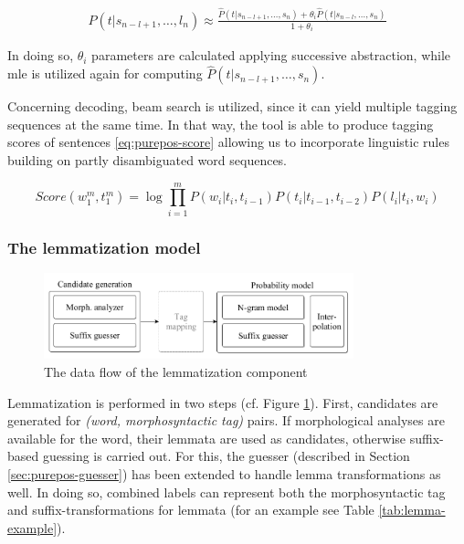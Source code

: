 \begin{align}
 P(t|s_{n-l+1}, \dots, l_n) 
 \approx \frac{ \hat{P}(t|s_{n-l+1}, \dots, s_n) + \theta_i \hat{P}(t|s_{n-l}, \dots, s_n)}{1+\theta_i}
\end{align}

In doing so, $\theta_i$ parameters are calculated applying successive abstraction, while \gls{mle} is utilized  again for computing $\hat{P}(t|s_{n-l+1}, \dots, s_n)$. 

Concerning decoding, beam search is utilized, since it can yield multiple tagging sequences at the same time. 
In that way, the tool is able to produce tagging scores of sentences \eqref{eq:purepos-score} allowing us to incorporate linguistic rules building on partly disambiguated word sequences. 

\begin{equation}\label{eq:purepos-score} %
Score(w_1^m,t_1^m) = \log \prod_{i=1}^m P(w_i|t_i,t_{i-1})P(t_i|t_{i-1},t_{i-2})P(l_i|t_i,w_i)
\end{equation}

\subsubsection{The lemmatization model}

\begin{figure}[H]
  \centering
  \includegraphics[width=0.8\textwidth]{MorphTagging/lemma_arch.png} %
  \caption{The data flow of the lemmatization component}
  \label{fig:lemma-arch}
\end{figure}

Lemmatization is performed in two steps (cf. Figure \ref{fig:lemma-arch}). 
First, candidates are generated for \emph{(word, morphosyntactic tag)} pairs. 
If morphological analyses are available for the word, their lemmata are used as candidates, otherwise suffix-based guessing is carried out. 
For this, the guesser (described in Section \ref{sec:purepos-guesser}) has been extended to handle lemma transformations as well. 
In doing so, combined labels can represent both the morphosyntactic tag and suffix-transformations for lemmata (for an example see Table \ref{tab:lemma-example}).


